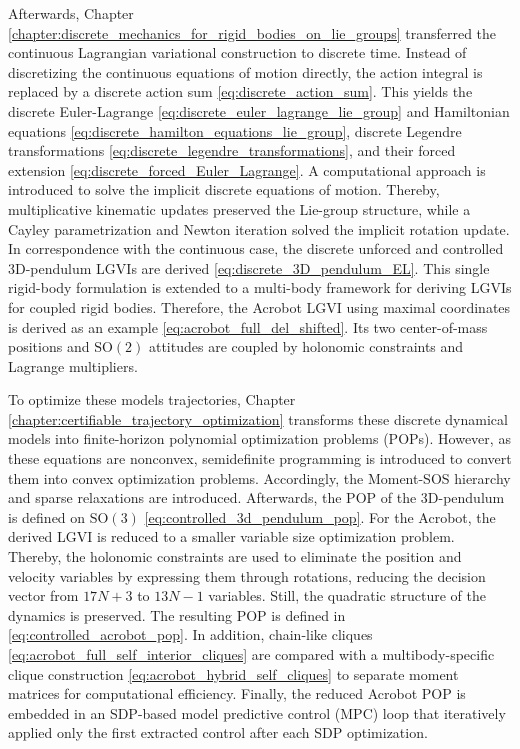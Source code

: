 Afterwards, Chapter \ref{chapter:discrete_mechanics_for_rigid_bodies_on_lie_groups} 
transferred the continuous Lagrangian variational construction to discrete time. 
Instead of
discretizing the continuous equations of motion directly, the action integral is
replaced by a discrete action sum \eqref{eq:discrete_action_sum}. 
This yields the discrete Euler-Lagrange \eqref{eq:discrete_euler_lagrange_lie_group} 
and Hamiltonian equations \eqref{eq:discrete_hamilton_equations_lie_group}, 
discrete Legendre transformations \eqref{eq:discrete_legendre_transformations}, 
and their forced extension \eqref{eq:discrete_forced_Euler_Lagrange}. 
A computational approach is introduced to solve the implicit discrete equations of motion. 
Thereby, multiplicative kinematic updates preserved the Lie-group structure, 
while a Cayley parametrization and Newton iteration solved the implicit rotation 
update. In correspondence with the continuous case, the discrete 
unforced and controlled 3D-pendulum LGVIs are derived \eqref{eq:discrete_3D_pendulum_EL}. 
This single rigid-body formulation is
extended to a multi-body framework for deriving LGVIs for coupled rigid bodies. 
Therefore, the Acrobot LGVI using maximal coordinates is derived as an example 
\eqref{eq:acrobot_full_del_shifted}. Its two center-of-mass positions and
$\mathrm{SO}(2)$ attitudes are coupled by holonomic constraints and
Lagrange multipliers.

To optimize these models trajectories, Chapter \ref{chapter:certifiable_trajectory_optimization} 
transforms these discrete dynamical models into finite-horizon polynomial
optimization problems (POPs). However, as these equations are nonconvex,
semidefinite programming is introduced to convert them into convex optimization problems.
Accordingly, the Moment-SOS hierarchy and sparse relaxations are introduced. 
Afterwards, the POP of the 3D-pendulum is defined on
$\mathrm{SO}(3)$ \eqref{eq:controlled_3d_pendulum_pop}. 
For the Acrobot, the derived LGVI is reduced to a smaller variable size optimization problem.
Thereby, the holonomic constraints are used to eliminate
the position and velocity variables by expressing them through rotations, 
reducing the decision vector from $17N+3$ to $13N-1$ variables. Still, 
the quadratic structure of the dynamics is preserved. The resulting POP is defined in \eqref{eq:controlled_acrobot_pop}.
In addition, chain-like cliques \eqref{eq:acrobot_full_self_interior_cliques} 
are compared with a multibody-specific
clique construction \eqref{eq:acrobot_hybrid_self_cliques} 
to separate moment matrices for computational efficiency.
Finally, the reduced Acrobot POP is embedded in an SDP-based
model predictive control (MPC) loop that iteratively applied only the first extracted control
after each SDP optimization.

